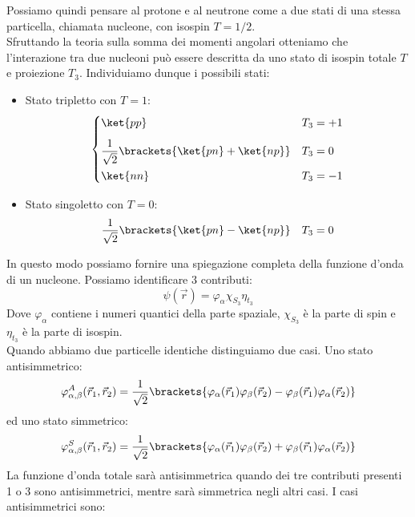 Possiamo quindi pensare al protone e al neutrone come a due stati di una stessa particella, chiamata nucleone, con isospin $T=1/2$.\\
Sfruttando la teoria sulla somma dei momenti angolari otteniamo che l'interazione tra due nucleoni può essere descritta da uno stato di isospin totale $T$ e proiezione $T_3$. Individuiamo dunque i possibili stati:
\begin{itemize}
 \item Stato tripletto con $T=1$:
 \begin{equation}
  \begin{cases}
   \ket{pp} & T_3 = +1 \\[8pt]
   \dfrac{1}{\sqrt{2}}\brackets{\ket{pn} + \ket{np}} & T_3 = 0 \\[8pt]
   \ket{nn} & T_3 = -1
  \end{cases}
 \end{equation}
 \item Stato singoletto con $T=0$:
 \begin{equation}
  \dfrac{1}{\sqrt{2}}\brackets{\ket{pn} - \ket{np}} \quad T_3 = 0
 \end{equation}
\end{itemize}
In questo modo possiamo fornire una spiegazione completa della funzione d'onda di un nucleone. Possiamo identificare 3 contributi:
\begin{equation}
  \psi(\vec{r}) = \varphi_{\alpha} \chi_{S_3} \eta_{t_3}
\end{equation}
Dove $\varphi_{\alpha}$ contiene i numeri quantici della parte spaziale, $\chi_{S_3}$ è la parte di spin e $\eta_{t_3}$ è la parte di isospin.\\
Quando abbiamo due particelle identiche distinguiamo due casi. Uno stato antisimmetrico:
\begin{equation}
  \varphi_{\alpha,\beta}^A(\vec{r}_1, \vec{r}_2) = \dfrac{1}{\sqrt{2}}\brackets{\varphi_{\alpha}(\vec{r}_1) \varphi_{\beta}(\vec{r}_2) - \varphi_{\beta}(\vec{r}_1) \varphi_{\alpha}(\vec{r}_2)}
\end{equation}
ed uno stato simmetrico:
\begin{equation}
  \varphi_{\alpha,\beta}^S(\vec{r}_1, \vec{r}_2) = \dfrac{1}{\sqrt{2}}\brackets{\varphi_{\alpha}(\vec{r}_1) \varphi_{\beta}(\vec{r}_2) + \varphi_{\beta}(\vec{r}_1) \varphi_{\alpha}(\vec{r}_2)}
\end{equation}
La funzione d'onda totale sarà antisimmetrica quando dei tre contributi presenti 1 o 3 sono antisimmetrici, mentre sarà simmetrica negli altri casi. I casi antisimmetrici sono:

